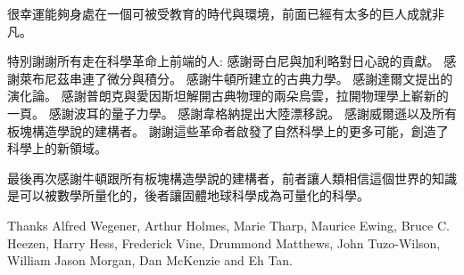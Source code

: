 
\begin{acknowledgement}

很幸運能夠身處在一個可被受教育的時代與環境，前面已經有太多的巨人成就非凡。

特別謝謝所有走在科學革命上前端的人:
感謝哥白尼與加利略對日心說的貢獻。
感謝萊布尼茲串連了微分與積分。 
感謝牛頓所建立的古典力學。
感謝達爾文提出的演化論。
感謝普朗克與愛因斯坦解開古典物理的兩朵烏雲，拉開物理學上嶄新的一頁。
感謝波耳的量子力學。
感謝韋格納提出大陸漂移說。
感謝威爾遜以及所有板塊構造學說的建構者。
謝謝這些革命者啟發了自然科學上的更多可能，創造了科學上的新領域。

最後再次感謝牛頓跟所有板塊構造學說的建構者，前者讓人類相信這個世界的知識是可以被數學所量化的，後者讓固體地球科學成為可量化的科學。

Thanks Alfred Wegener, Arthur Holmes, Marie Tharp, Maurice Ewing, Bruce C. Heezen, Harry Hess, Frederick Vine, Drummond Matthews, John Tuzo-Wilson, William Jason Morgan, Dan McKenzie and Eh Tan.

\end{acknowledgement}